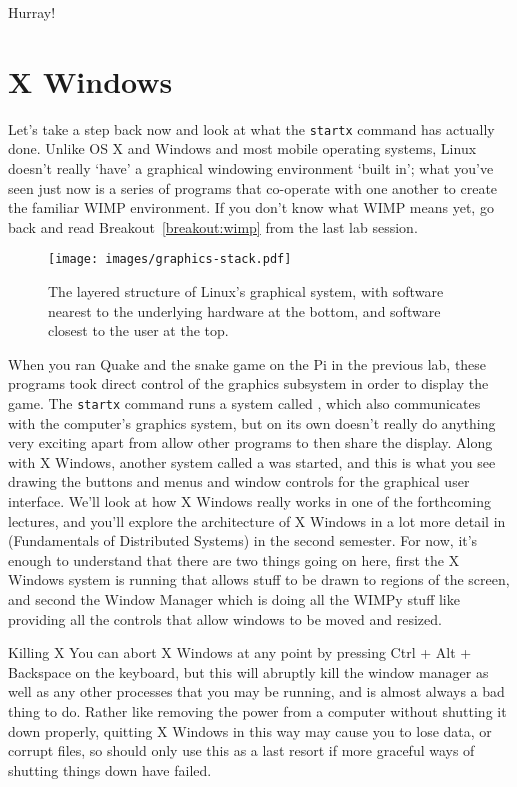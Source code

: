 Hurray!

\section{X Windows}

Let's take a step back now and look at what the \texttt{startx} command has actually done. Unlike OS X and Windows and most mobile operating systems, Linux doesn't really `have' a graphical windowing environment `built in'; what you've seen just now is a series of programs that co-operate with one another to  create the familiar WIMP environment.  If you don't know what WIMP means yet, go back and read Breakout~\ref{breakout:wimp} from the last lab session.

\begin{figure}[htb]
  \begin{center}
    \texttt{[image: images/graphics-stack.pdf]}
  \end{center}
\caption{The layered structure of Linux's graphical system, with software nearest to the underlying hardware at the bottom, and software closest to the user at the top.}
\label{figure:Xstructure}
\end{figure}

When you ran Quake and the snake game on the Pi in the previous lab, these programs took direct control of the graphics subsystem in order to display the game. The \texttt{startx} command runs a system called , which also communicates with the computer's graphics system, but on its own doesn't really do anything very exciting apart from allow other programs to then share the display. Along with X Windows, another system called a  was started, and this is what you see drawing the buttons and menus and window controls for the graphical user interface. We'll look at how X Windows really works in one of the forthcoming  lectures, and you'll explore the architecture of X Windows in a lot more detail in  (Fundamentals of Distributed Systems) in the second semester. For now, it's enough to understand that there are two things going on here, first the X Windows system is running that allows stuff to be drawn to regions of the screen, and second the Window Manager which is doing all the WIMPy stuff like providing all the controls that allow windows to be moved and resized.

\begin{danger}{Killing X}
You can abort X Windows at any point by pressing Ctrl + Alt + Backspace on the keyboard, but this will abruptly kill the window manager as well as any other processes that you may be running, and is almost always a bad thing to do. Rather like removing the power from a computer without shutting it down properly, quitting X Windows in this way may cause you to lose data, or corrupt files, so should only use this as a last resort if more graceful ways of shutting things down have failed.
\end{danger}

